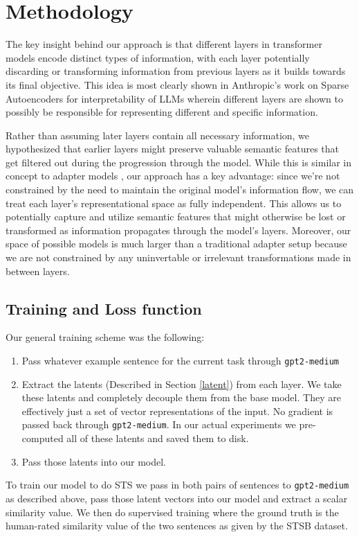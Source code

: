 \documentclass{article}
\begin{document}
\section{Methodology}
The key insight behind our approach is that different layers in transformer models encode distinct types of information, with each layer potentially discarding or transforming information from previous layers as it builds towards its final objective. This idea is most clearly shown in Anthropic's work on Sparse Autoencoders for interpretability of LLMs \cite{bricken2023monosemanticity} wherein different layers are shown to possibly be responsible for representing different and specific information.

Rather than assuming later layers contain all necessary information, we hypothesized that earlier layers might preserve valuable semantic features that get filtered out during the progression through the model. While this is similar in concept to adapter models \cite{houlsby2019parameterefficienttransferlearningnlp}, our approach has a key advantage: since we're not constrained by the need to maintain the original model's information flow, we can treat each layer's representational space as fully independent. This allows us to potentially capture and utilize semantic features that might otherwise be lost or transformed as information propagates through the model's layers. Moreover, our space of possible models is much larger than a traditional adapter setup because we are not constrained by any uninvertable or irrelevant transformations made in between layers.

\subsection{Training and Loss function} \label{Loss} \label{Training}
Our general training scheme was the following:
\begin{enumerate}
    \item Pass whatever example sentence for the current task through \verb|gpt2-medium|
    \item Extract the latents (Described in Section \ref{latent}) from each layer. We take these latents and completely decouple them from the base model. They are effectively just a set of vector representations of the input. No gradient is passed back through \verb|gpt2-medium|. In our actual experiments we pre-computed all of these latents and saved them to disk.
    \item Pass those latents into our model.
\end{enumerate}
To train our model to do STS we pass in both pairs of sentences to \verb|gpt2-medium| as described above, pass those latent vectors into our model and extract a scalar similarity value. We then do supervised training where the ground truth is the human-rated similarity value of the two sentences as given by the STSB dataset.
\end{document}
